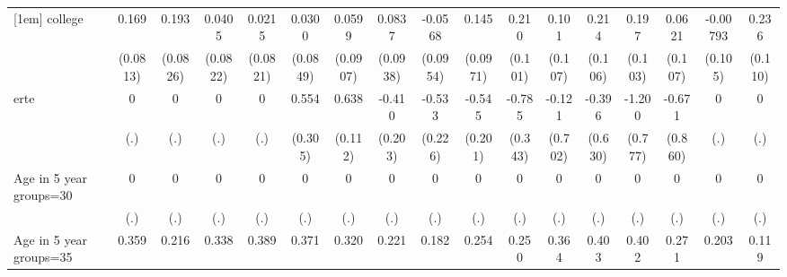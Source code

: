 {\begin{tabular}{l*{16}{c}}
[1em]
college             &       0.169\sym{*}  &       0.193\sym{*}  &      0.0405         &      0.0215         &      0.0300         &      0.0599         &      0.0837         &     -0.0568         &       0.145         &       0.210\sym{*}  &       0.101         &       0.214\sym{*}  &       0.197         &      0.0621         &    -0.00793         &       0.236\sym{*}  \\
                    &    (0.0813)         &    (0.0826)         &    (0.0822)         &    (0.0821)         &    (0.0849)         &    (0.0907)         &    (0.0938)         &    (0.0954)         &    (0.0971)         &     (0.101)         &     (0.107)         &     (0.106)         &     (0.103)         &     (0.107)         &     (0.105)         &     (0.110)         \\
[1em]
erte                &           0         &           0         &           0         &           0         &       0.554         &       0.638\sym{***}&      -0.410\sym{*}  &      -0.533\sym{*}  &      -0.545\sym{**} &      -0.785\sym{*}  &      -0.121         &      -0.396         &      -1.200         &      -0.671         &           0         &           0         \\
                    &         (.)         &         (.)         &         (.)         &         (.)         &     (0.305)         &     (0.112)         &     (0.203)         &     (0.226)         &     (0.201)         &     (0.343)         &     (0.702)         &     (0.630)         &     (0.777)         &     (0.860)         &         (.)         &         (.)         \\
[1em]
Age in 5 year groups=30&           0         &           0         &           0         &           0         &           0         &           0         &           0         &           0         &           0         &           0         &           0         &           0         &           0         &           0         &           0         &           0         \\
                    &         (.)         &         (.)         &         (.)         &         (.)         &         (.)         &         (.)         &         (.)         &         (.)         &         (.)         &         (.)         &         (.)         &         (.)         &         (.)         &         (.)         &         (.)         &         (.)         \\
[1em]
Age in 5 year groups=35&       0.359\sym{***}&       0.216\sym{***}&       0.338\sym{***}&       0.389\sym{***}&       0.371\sym{***}&       0.320\sym{***}&       0.221\sym{**} &       0.182\sym{**} &       0.254\sym{***}&       0.250\sym{**} &       0.364\sym{***}&       0.403\sym{***}&       0.402\sym{***}&       0.271\sym{***}&       0.203\sym{*}  &       0.119         \\

\end{tabular}}

